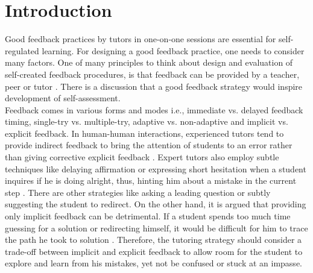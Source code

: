 \chapter{Introduction}
\label{chap:intro}
Good feedback practices by tutors in one-on-one sessions are essential for self-regulated learning. For designing a good feedback practice, one needs to consider many factors. One of many principles to think about design and evaluation of self-created feedback procedures, is that feedback can be provided by a teacher, peer or tutor \parencite{nicol2006formative}. There is a discussion that a good feedback strategy would inspire development of self-assessment.  \\
Feedback comes in various forms and modes \parencite{narciss2008feedback} i.e., immediate vs. delayed feedback timing, single-try vs. multiple-try, adaptive vs. non-adaptive and implicit vs. explicit feedback. In human-human interactions, experienced tutors tend to provide indirect feedback to bring the attention of students to an error rather than giving corrective explicit feedback \parencite{lepper1990self}. Expert tutors also employ subtle techniques like delaying affirmation or expressing short hesitation when a student inquires if he is doing alright, thus, hinting him about a mistake in the current step \parencite{fox1991cognitive}. There are other strategies like asking a leading question or subtly suggesting the student to redirect. On the other hand, it is argued that providing only implicit feedback can be detrimental. If a student spends too much time guessing for a solution or redirecting himself, it would be difficult for him to trace the path he took to solution \parencite{lewis1985discrimination}. Therefore, the tutoring strategy should consider a trade-off between implicit and explicit feedback to allow room for the student to explore and learn from his mistakes, yet not be confused or stuck at an impasse.\\
